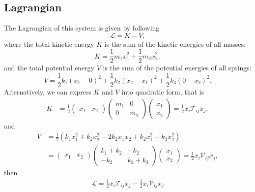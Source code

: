 \documentclass[a4paper, reprint, showkeys, nofootinbib,twoside]{revtex4-1}
\begin{document}
        \subsection{Lagrangian}
        The Lagrangian of this system is given by following
	 \begin{equation}
        \mathcal{L}=K-V,
	\end{equation}
	where the total kinetic energy $K$ is the sum of the kinetic energies of all masses:
	\begin{equation}
	K = \frac{1}{2}m_1\dot{x}_1^2 + \frac{1}{2}m_2\dot{x}_2^2, 
	\end{equation}
	and the total potential energy $V$ is the sum of the potential energies of all springs:
	\begin{equation}
	V =\frac{1}{2}k_1\left(x_1-0\right)^2+\frac{1}{2}k_2\left(x_2-x_1\right)^2+\frac{1}{2}k_3\left(0-x_2\right)^2.
	\end{equation}
	Alternatively, we can express $K$ and $V$ into quadratic form, that is
	\begin{equation}
	\begin{aligned}
	K &= \frac{1}{2}
		\begin{pmatrix}\dot{x}_1&\dot{x}_2\end{pmatrix}
		\begin{pmatrix}m_1&0\\0&m_2\end{pmatrix}
		\begin{pmatrix}\dot{x}_1\\\dot{x}_2\end{pmatrix}
		= \frac{1}{2}\dot{x}_i\mathcal{T}_{ij}\dot{x}_j,
	\end{aligned}
	\end{equation}
	and 
	\begin{equation}
	\begin{aligned}
	V &= \frac{1}{2}\left(k_1x_1^2+k_2x_2^2-2k_2x_1x_2+k_2x_1^2+k_3x_2^2\right)\\
	&=	\begin{pmatrix}x_1&x_2\end{pmatrix}
		\begin{pmatrix}k_1+k_2&-k_2\\-k_2&k_2+k_3\end{pmatrix}
		\begin{pmatrix}x_1\\x_2\end{pmatrix}
	= \frac{1}{2}x_i\mathcal{V}_{ij}x_j,
	\end{aligned}
	\end{equation}
	then
	\begin{equation}
	\begin{aligned}
	 \mathcal{L}= \frac{1}{2}\dot{x}_i\mathcal{T}_{ij}\dot{x}_j-\frac{1}{2}x_i\mathcal{V}_{ij}x_j
	\end{aligned}
	\end{equation}
\end{document}
